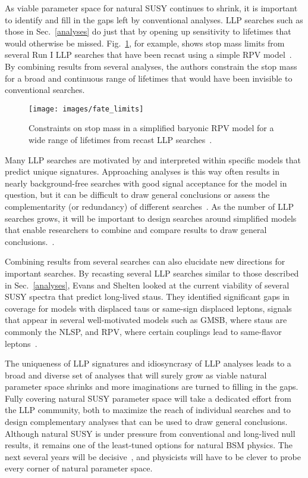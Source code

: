 \documentclass[12pt]{article}
\begin{document}
    As viable parameter space for natural SUSY continues to shrink, it is important to identify and fill in the gaps left by conventional analyses. LLP searches such as those in Sec.~\ref{analyses} do just that by opening up sensitivity to lifetimes that would otherwise be missed. Fig.~\ref{fate_limits}, for example, shows stop mass limits from several Run I LLP searches that have been recast using a simple RPV model~\cite{fate}. By combining results from several analyses, the authors constrain the stop mass for a broad and continuous range of lifetimes that would have been invisible to conventional searches. 

        \noindent \begin{figure}[htbp] \begin{center}
        \texttt{[image: images/fate\_limits]}
        \caption{Constraints on stop mass in a simplified baryonic RPV model for a wide range of lifetimes from recast LLP searches~\cite{fate}.}
        \label{fate_limits}
        \end{center} \end{figure}

    Many LLP searches are motivated by and interpreted within specific models that predict unique signatures. Approaching analyses is this way often results in nearly background-free searches with good signal acceptance for the model in question, but it can be difficult to draw general conclusions or assess the complementarity (or redundancy) of different searches~\cite{fate}. As the number of LLP searches grows, it will be important to design searches around simplified models that enable researchers to combine and compare results to draw general conclusions.~\cite{evans_talk}.

    Combining results from several searches can also elucidate new directions for important searches. By recasting several LLP searches similar to those described in Sec.~\ref{analyses}, Evans and Shelten looked at the current viability of several SUSY spectra that predict long-lived staus. They identified significant gaps in coverage for models with displaced taus or same-sign displaced leptons, signals that appear in several well-motivated models such as GMSB, where staus are commonly the NLSP, and RPV, where certain couplings lead to same-flavor leptons~\cite{ll_staus}. 

    The uniqueness of LLP signatures and idiosyncrasy of LLP analyses leads to a broad and diverse set of analyses that will surely grow as viable natural parameter space shrinks and more imaginations are turned to filling in the gaps. Fully covering natural SUSY parameter space will take a dedicated effort from the LLP community, both to maximize the reach of individual searches and to design complementary analyses that can be used to draw general conclusions. Although natural SUSY is under pressure from conventional and long-lived null results, it remains one of the least-tuned options for natural BSM physics. The next several years will be decisive~\cite{cornering}, and physicists will have to be clever to probe every corner of natural parameter space.

\clearpage
\pagebreak
\singlespacing
{}

\end{document}
